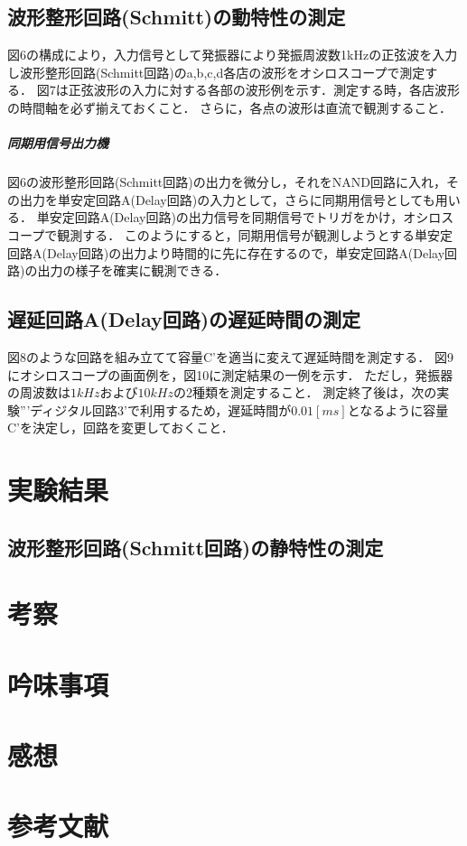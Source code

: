 \documentclass[10pt, a4j, dvipdfmx]{jarticle}
\begin{document}
\subsection{波形整形回路(Schmitt)の動特性の測定}
図6の構成により，入力信号として発振器により発振周波数1kHzの正弦波を入力し波形整形回路(Schmitt回路)のa,b,c,d各店の波形をオシロスコープで測定する．
図7は正弦波形の入力に対する各部の波形例を示す．測定する時，各店波形の時間軸を必ず揃えておくこと．
さらに，各点の波形は直流で観測すること．
\subparagraph{同期用信号出力機}
図6の波形整形回路(Schmitt回路)の出力を微分し，それをNAND回路に入れ，その出力を単安定回路A(Delay回路)の入力として，さらに同期用信号としても用いる．
単安定回路A(Delay回路)の出力信号を同期信号でトリガをかけ，オシロスコープで観測する．
このようにすると，同期用信号が観測しようとする単安定回路A(Delay回路)の出力より時間的に先に存在するので，単安定回路A(Delay回路)の出力の様子を確実に観測できる．

\subsection{遅延回路A(Delay回路)の遅延時間の測定}
図8のような回路を組み立てて容量C'を適当に変えて遅延時間を測定する．
図9にオシロスコープの画面例を，図10に測定結果の一例を示す．
ただし，発振器の周波数は$1kHz$および$10kHz$の2種類を測定すること．
測定終了後は，次の実験'''ディジタル回路3'で利用するため，遅延時間が$0.01[ms]$となるように容量C'を決定し，回路を変更しておくこと．


\section{実験結果}
\subsection{波形整形回路(Schmitt回路)の静特性の測定}

\section{考察}

\section{吟味事項}

\section{感想}

\section{参考文献}
\end{document}
